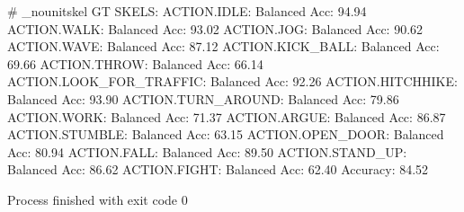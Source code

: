 # _nounitskel
GT SKELS:
ACTION.IDLE: Balanced Acc: 94.94%
ACTION.WALK: Balanced Acc: 93.02%
ACTION.JOG: Balanced Acc: 90.62%
ACTION.WAVE: Balanced Acc: 87.12%
ACTION.KICK_BALL: Balanced Acc: 69.66%
ACTION.THROW: Balanced Acc: 66.14%
ACTION.LOOK_FOR_TRAFFIC: Balanced Acc: 92.26%
ACTION.HITCHHIKE: Balanced Acc: 93.90%
ACTION.TURN_AROUND: Balanced Acc: 79.86%
ACTION.WORK: Balanced Acc: 71.37%
ACTION.ARGUE: Balanced Acc: 86.87%
ACTION.STUMBLE: Balanced Acc: 63.15%
ACTION.OPEN_DOOR: Balanced Acc: 80.94%
ACTION.FALL: Balanced Acc: 89.50%
ACTION.STAND_UP: Balanced Acc: 86.62%
ACTION.FIGHT: Balanced Acc: 62.40%
Accuracy: 84.52%

Process finished with exit code 0

